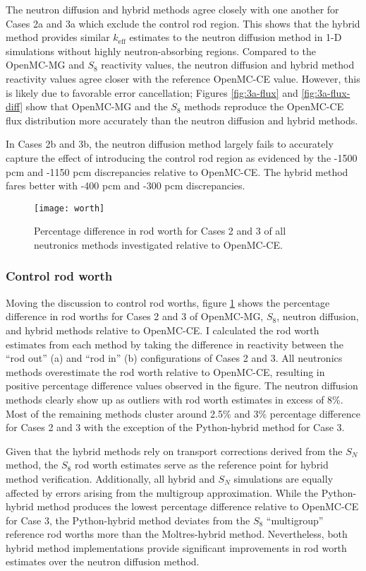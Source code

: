 The neutron diffusion and hybrid methods agree closely with one another for Cases 2a and 3a which
exclude the control rod region. This shows that the hybrid method provides similar $k_\text{eff}$
estimates to the neutron diffusion method in 1-D simulations without highly neutron-absorbing
regions. Compared to the OpenMC-MG and $S_8$ reactivity values, the neutron diffusion and hybrid
method reactivity values agree closer with the reference OpenMC-CE value. However, this is likely
due to favorable error cancellation; Figures \ref{fig:3a-flux} and \ref{fig:3a-flux-diff} show that
OpenMC-MG and the $S_8$ methods reproduce
the OpenMC-CE flux distribution more accurately than the neutron diffusion and hybrid methods.

In Cases 2b and 3b, the neutron diffusion method largely fails to accurately capture the
effect of introducing the control rod region as evidenced by the -1500 pcm and -1150 pcm
discrepancies relative to OpenMC-CE. The hybrid method fares better with -400 pcm and -300 pcm
discrepancies.

\begin{figure}[htb!]
  \centering
  \texttt{[image: worth]}
  \caption{Percentage difference in rod worth for Cases 2 and 3 of all neutronics methods
  investigated relative to OpenMC-CE.}
  \label{fig:1d-worth}
\end{figure}

\subsubsection{Control rod worth}

Moving the discussion to control rod worths, figure \ref{fig:1d-worth} shows the percentage
difference in rod worths for Cases 2 and 3 of OpenMC-MG, $S_8$, neutron diffusion, and hybrid
methods relative to OpenMC-CE. I calculated the rod worth estimates from each method by taking the
difference in reactivity between the ``rod out'' (a) and ``rod in'' (b) configurations of Cases 2
and 3. All neutronics methods overestimate the rod worth relative to OpenMC-CE, resulting in
positive percentage difference values observed in the figure.
The neutron diffusion methods clearly show up as outliers with rod worth estimates in excess
of 8\%. Most of the remaining methods cluster around 2.5\% and 3\% percentage difference for Cases
2 and 3 with the exception of the Python-hybrid method for Case 3.

Given that the hybrid methods rely on transport corrections derived from the $S_N$ method, the
$S_8$ rod worth estimates serve as the
reference point for hybrid method verification. Additionally, all hybrid and $S_N$ simulations are
equally affected by errors arising from the multigroup approximation. While the Python-hybrid
method produces the lowest percentage difference relative to OpenMC-CE for Case 3, the
Python-hybrid method deviates from the $S_8$ ``multigroup'' reference rod worths more than the
Moltres-hybrid method. Nevertheless, both hybrid method implementations provide significant
improvements in rod worth estimates over the neutron diffusion method.

